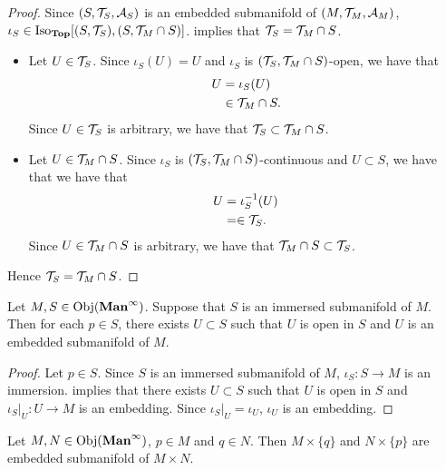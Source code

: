 \documentclass{book}
\begin{document}
	\begin{proof}
		Since $(S, \mathcal{T}_S, \mathcal{A}_S)$ is an embedded submanifold of $(M, \mathcal{T}_M, \mathcal{A}_M)$, $\iota_S \in \operatorname{Iso}_{\operatorname*{\text{\textbf{Top}}}}[(S, \mathcal{T}_S), (S, \mathcal{T}_M \cap S)]$.  implies that $\mathcal{T}_S = \mathcal{T}_M \cap S$.
		\begin{itemize}
			\item Let $U \in \mathcal{T}_S$. Since $\iota_S(U) = U$ and $\iota_S$ is $(\mathcal{T}_S, \mathcal{T}_M \cap S)$-open, we have that 
			\begin{align*}
				U 
				& = \iota_S(U) \\
				& \in \mathcal{T}_M \cap S.
			\end{align*}
			Since $U \in \mathcal{T}_S$ is arbitrary, we have that $\mathcal{T}_S \subset \mathcal{T}_M \cap S$.  
			\item Let $U \in \mathcal{T}_M \cap S$. Since $\iota_S$ is $(\mathcal{T}_S, \mathcal{T}_M \cap S)$-continuous and $U \subset S$, we have that we have that 
			\begin{align*}
				U
				& = \iota_S^{-1}(U) \\
				& = \in \mathcal{T}_S.
			\end{align*}
			Since $U \in \mathcal{T}_M \cap S$ is arbitrary, we have that  $\mathcal{T}_M \cap S \subset \mathcal{T}_S$. 
		\end{itemize}
		Hence $\mathcal{T}_S = \mathcal{T}_M \cap S$. 
	\end{proof}
	
	\begin{ex}
		Let $M, S \in \operatorname{Obj}(\operatorname*{\text{\textbf{Man}}^{\infty}})$. Suppose that $S$ is an immersed submanifold of $M$. Then for each $p \in S$, there exists $U \subset S$ such that $U$ is open in $S$ and $U$ is an embedded submanifold of $M$. 
	\end{ex}
	
	\begin{proof}
		Let $p \in S$. Since $S$ is an immersed submanifold of $M$, $\iota_S:S \rightarrow M$ is an immersion.  implies that there exists $U \subset S$ such that $U$ is open in $S$ and $\iota_S|_U : U \rightarrow M$ is an embedding. Since $\iota_S|_U = \iota_U$, $\iota_U$ is an embedding.
	\end{proof}
	

	\begin{ex} 
		Let $M, N \in \operatorname{Obj}(\operatorname*{\text{\textbf{Man}}^{\infty}})$, $p \in M$ and $q \in N$. Then $M \times \{q\}$ and $N \times \{p\}$ are embedded submanifold of $M \times N$. 
	\end{ex}
\end{document}
